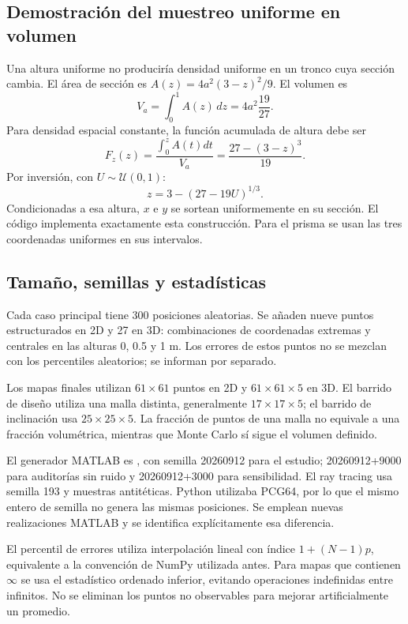 \subsection{Demostración del muestreo uniforme en volumen}
Una altura uniforme no produciría densidad uniforme en un tronco cuya sección cambia. El área de sección es $A(z)=4a^2(3-z)^2/9$. El volumen es
\begin{equation}
V_a=\int_0^1 A(z)\,dz=4a^2\frac{19}{27}.
\end{equation}
Para densidad espacial constante, la función acumulada de altura debe ser
\begin{equation}
F_z(z)=\frac{\int_0^z A(t)dt}{V_a}=\frac{27-(3-z)^3}{19}.
\end{equation}
Por inversión, con $U\sim\mathcal U(0,1)$:
\begin{equation}
z=3-(27-19U)^{1/3}.
\end{equation}
Condicionadas a esa altura, $x$ e $y$ se sortean uniformemente en su sección. El código implementa exactamente esta construcción. Para el prisma se usan las tres coordenadas uniformes en sus intervalos.

\subsection{Tamaño, semillas y estadísticas}
Cada caso principal tiene 300 posiciones aleatorias. Se añaden nueve puntos estructurados en 2D y 27 en 3D: combinaciones de coordenadas extremas y centrales en las alturas 0, 0.5 y 1 m. Los errores de estos puntos no se mezclan con los percentiles aleatorios; se informan por separado.

Los mapas finales utilizan $61\times61$ puntos en 2D y $61\times61\times5$ en 3D. El barrido de diseño utiliza una malla distinta, generalmente $17\times17\times5$; el barrido de inclinación usa $25\times25\times5$. La fracción de puntos de una malla no equivale a una fracción volumétrica, mientras que Monte Carlo sí sigue el volumen definido.

El generador MATLAB es , con semilla 20260912 para el estudio; 20260912+9000 para auditorías sin ruido y 20260912+3000 para sensibilidad. El ray tracing usa semilla 193 y muestras antitéticas. Python utilizaba PCG64, por lo que el mismo entero de semilla no genera las mismas posiciones. Se emplean nuevas realizaciones MATLAB y se identifica explícitamente esa diferencia.

El percentil de errores utiliza interpolación lineal con índice $1+(N-1)p$, equivalente a la convención de NumPy utilizada antes. Para mapas que contienen $\infty$ se usa el estadístico ordenado inferior, evitando operaciones indefinidas entre infinitos. No se eliminan los puntos no observables para mejorar artificialmente un promedio.

